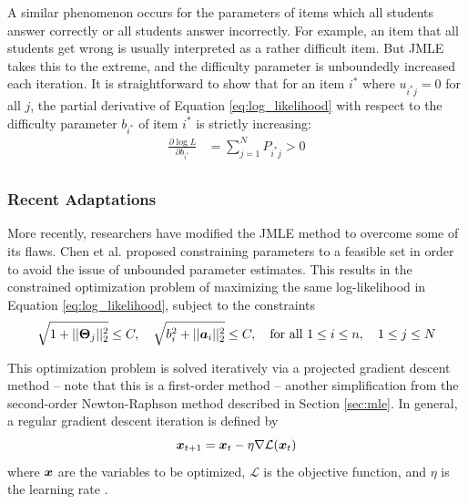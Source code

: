 A similar phenomenon occurs for the parameters of items which all students answer correctly or all students answer incorrectly. For example, an item that all students get wrong is usually interpreted as a rather difficult item. But JMLE takes this to the extreme, and the difficulty parameter is unboundedly increased each iteration. It is straightforward to show that for an item $i^*$ where $u_{i^*j} = 0$ for all $j$, the partial derivative of Equation \ref{eq:log_likelihood} with respect to the difficulty parameter $b_{i^*}$ of item $i^*$ is strictly increasing:%
\begin{equation}
  \begin{split}
  \frac{\partial \log L}{\partial b_{i^*}} &= \sum_{j=1}^N P_{i^*j}  > 0 \\
  \end{split}
  \label{eq:diff_item_partial}
\end{equation}


\subsubsection{Recent Adaptations}
More recently, researchers have modified the JMLE method to overcome some of its flaws. Chen et al. \cite{chen2019} proposed constraining parameters to a feasible set in order to avoid the issue of unbounded parameter estimates. This results in the constrained optimization problem of maximizing the same log-likelihood in Equation \ref{eq:log_likelihood}, subject to the constraints
\begin{equation}
  \sqrt{1 + ||\boldsymbol{\Theta}_j||_2^2} \leq C, \quad \sqrt{b_i^2 + ||\boldsymbol{a}_i||_2^2} \leq C, \quad \text{for all } 1\leq i \leq n, \quad 1 \leq j \leq N
  \label{eq:cjmle_constraints}
\end{equation}

This optimization problem is solved iteratively via a projected gradient descent method -- note that this is a first-order method -- another simplification from the second-order Newton-Raphson method described in Section \ref{sec:mle}. In general, a regular gradient descent iteration is defined by
\begin{equation}
  \boldsymbol{x}_{t+1} = \boldsymbol{x}_t - \eta \nabla \mathcal{L}(\boldsymbol{x}_t)
  \label{eq:grad_descent}
\end{equation}
where $\boldsymbol{x}$ are the variables to be optimized, $\mathcal{L}$ is the objective function, and $\eta$ is the learning rate \cite{ruder2017}.

